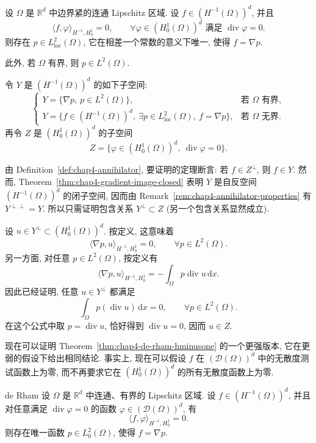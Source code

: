 \begin{Theorem}
\label{thm:chap4-de-rham-hminusone}
设 $\Omega$ 是 $\mathbb R^d$ 中边界紧的连通 Lipschitz 区域. 设 $f\in(H^{-1}(\Omega))^d$, 并且
\[
 \langle f,\varphi\rangle_{H^{-1},H_0^1}=0,
 \qquad\forall\varphi\in(H_0^1(\Omega))^d\text{ 满足 }\operatorname{div}\varphi=0.
\]
则存在 $p\in L_{\mathrm{loc}}^2(\Omega)$, 它在相差一个常数的意义下唯一, 使得 $f=\nabla p$.

此外, 若 $\Omega$ 有界, 则 $p\in L^2(\Omega)$.
\end{Theorem}

\begin{Proof}
令 $Y$ 是 $(H^{-1}(\Omega))^d$ 的如下子空间:
\[
 \begin{cases}
 Y=\{\nabla p,\ p\in L^2(\Omega)\},&\text{若 }\Omega\text{ 有界},\\
 Y=\{f\in(H^{-1}(\Omega))^d,\ \exists p\in L_{\mathrm{loc}}^2(\Omega),\ f=\nabla p\},&\text{若 }\Omega\text{ 无界}.
 \end{cases}
\]
再令 $Z$ 是 $(H_0^1(\Omega))^d$ 的子空间
\[
 Z=\{\varphi\in(H_0^1(\Omega))^d,\ \operatorname{div}\varphi=0\}.
\]

由 Definition~\ref{def:chap4-annihilator}, 要证明的定理断言: 若 $f\in Z^\perp$, 则 $f\in Y$. 然而, Theorem~\ref{thm:chap4-gradient-image-closed} 表明 $Y$ 是自反空间 $(H^{-1}(\Omega))^d$ 的闭子空间, 因而由 Remark~\ref{rem:chap4-annihilator-properties} 有 $Y^{\perp\perp}=Y$. 所以只需证明包含关系 $Y^\perp\subset Z$ (另一个包含关系显然成立).

设 $u\in Y^\perp\subset(H_0^1(\Omega))^d$. 按定义, 这意味着
\[
 \langle\nabla p,u\rangle_{H^{-1},H_0^1}=0,
 \qquad\forall p\in L^2(\Omega).
\]
另一方面, 对任意 $p\in L^2(\Omega)$, 按定义有
\[
 \langle\nabla p,u\rangle_{H^{-1},H_0^1}
 =-\int_\Omega p\operatorname{div}u\,\mathrm dx.
\]
因此已经证明, 任意 $u\in Y^\perp$ 都满足
\[
 \int_\Omega p(\operatorname{div}u)\,\mathrm dx=0,
 \qquad\forall p\in L^2(\Omega).
\]
在这个公式中取 $p=\operatorname{div}u$, 恰好得到 $\operatorname{div}u=0$, 因而 $u\in Z$.
\end{Proof}

现在可以证明 Theorem~\ref{thm:chap4-de-rham-hminusone} 的一个更强版本, 它在更弱的假设下给出相同结论. 事实上, 现在可以假设 $f$ 在 $(\mathcal D(\Omega))^d$ 中的无散度测试函数上为零, 而不再要求它在 $(H_0^1(\Omega))^d$ 的所有无散度函数上为零.

\begin{Theorem}{de Rham}
\label{thm:chap4-de-rham}
设 $\Omega$ 是 $\mathbb R^d$ 中连通、有界的 Lipschitz 区域. 设 $f\in(H^{-1}(\Omega))^d$, 并且对任意满足 $\operatorname{div}\varphi=0$ 的函数 $\varphi\in(\mathcal D(\Omega))^d$, 有
\[
 \langle f,\varphi\rangle_{H^{-1},H_0^1}=0.
\]
则存在唯一函数 $p\in L_0^2(\Omega)$, 使得 $f=\nabla p$.
\end{Theorem}

